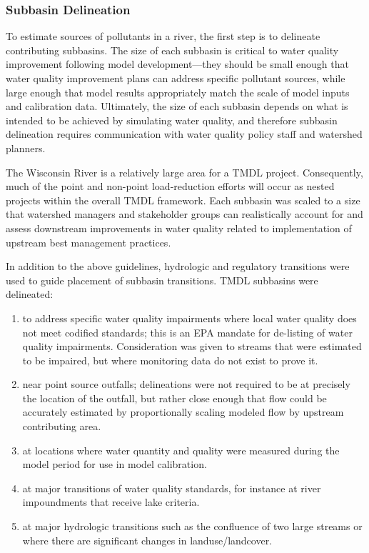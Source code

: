\subsubsection{Subbasin Delineation}\label{sec:sub_delineation}
To estimate sources of pollutants in a river, the first step is to delineate contributing subbasins. The size of each subbasin is critical to water quality improvement following model development---they should be small enough that water quality improvement plans can address specific pollutant sources, while large enough that model results appropriately match the scale of model inputs and calibration data. Ultimately, the size of each subbasin depends on what is intended to be achieved by simulating water quality, and therefore subbasin delineation requires communication with water quality policy staff and watershed planners.

The Wisconsin River is a relatively large area for a TMDL project. Consequently, much of the point and non-point load-reduction efforts will occur as nested projects within the overall TMDL framework. Each subbasin was scaled to a size that watershed managers and stakeholder groups can realistically account for and assess downstream improvements in water quality related to implementation of upstream best management practices.

In addition to the above guidelines, hydrologic and regulatory transitions were used to guide placement of subbasin transitions. TMDL subbasins were delineated: 
\begin{enumerate}
	\item to address specific water quality impairments where local water quality does not meet codified standards; this is an EPA mandate for de-listing of water quality impairments. Consideration was given to streams that were estimated to be impaired, but where monitoring data do not exist to prove it.
	\item near point source outfalls; delineations were not required to be at precisely the location of the outfall, but rather close enough that flow could be accurately estimated by proportionally scaling modeled flow by upstream contributing area.
	\item at locations where water quantity and quality were measured during the model period for use in model calibration.
	\item at major transitions of water quality standards, for instance at river impoundments that receive lake criteria.
	\item at major hydrologic transitions such as the confluence of two large streams or where there are significant changes in landuse/landcover.
\end{enumerate}

